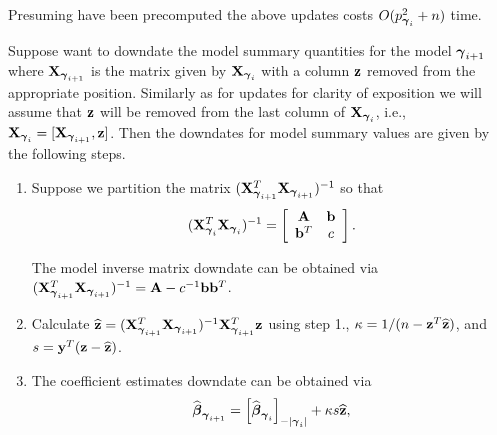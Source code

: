 \noindent Presuming  have been precomputed
the above updates costs $O(p_{{\boldsymbol \gamma}_{i}}^2 + n)$ time.

Suppose want to downdate the model summary quantities for the model
${\boldsymbol \gamma}_{i+1}$ where ${\bf X}_{{\boldsymbol \gamma}_{i+1}}$ is the matrix given by 
${\bf X}_{{\boldsymbol \gamma}_i}$ with a column ${\bf z}$ removed from the appropriate position.
Similarly as for updates for clarity of exposition we will assume that
${\bf z}$ will be removed from the last column of ${\bf X}_{{\boldsymbol \gamma}_i}$, i.e., 
${\bf X}_{{\boldsymbol \gamma}_{i}} = [{\bf X}_{{\boldsymbol \gamma}_{i+1}}, {\bf z}]$. 
Then the downdates for model summary values are given by the following steps.
\begin{enumerate}
	\item 
	Suppose we partition the matrix
	$({\bf X}_{{\boldsymbol \gamma}_{i+1}}^T{\bf X}_{{\boldsymbol \gamma}_{i+1}})^{-1}$ so that
	$$
	\displaystyle ({\bf X}_{{\boldsymbol \gamma}_{i}}^T{\bf X}_{{\boldsymbol \gamma}_{i}})^{-1} 
	= \left[ \begin{array}{cc}
	{\bf A}   & {\bf b} \\
	{\bf b}^T & c \\
	\end{array} \right].
	$$
	
	\noindent The model inverse matrix downdate can be obtained
	via   $({\bf X}_{{\boldsymbol \gamma}_{i+1}}^T{\bf X}_{{\boldsymbol \gamma}_{i+1}})^{-1} = {\bf A} - c^{-1}{\bf b}{\bf b}^T$.
	
	\item Calculate
	$\widehat{{\bf z}} = ({\bf X}_{{\boldsymbol \gamma}_{i+1}}^T{\bf X}_{{\boldsymbol \gamma}_{i+1}})^{-1}{\bf X}_{{\boldsymbol \gamma}_{i+1}}^T{\bf z}$ using step 1.,
	$\kappa = 1/(n - {\bf z}^T\widehat{{\bf z}})$,
	and $s = {\bf y}^T({\bf z} - \widehat{{\bf z}})$.
	
	\item 
	The coefficient estimates downdate can be obtained
	via
	$$
	\widehat{{\boldsymbol \beta}}_{{\boldsymbol \gamma}_{i+1}} = \left[ \widehat{{\boldsymbol \beta}}_{{\boldsymbol \gamma}_{i}} \right]_{-|{{\boldsymbol \gamma}_{i}}|} + \kappa s\widehat{{\bf z}},
	$$
	

\end{enumerate}
